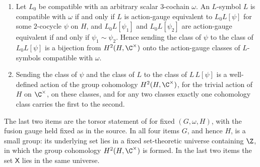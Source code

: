 \begin{lemma}
\begin{enumerate}
              $\beta\mathbin{\triangleright}\omega$ trivial on $H$, the
              same holds for $(\beta,1)\mathbin{\triangleright}L$ and the
              formula built from $\beta\mathbin{\triangleright}\omega$.
        \item Let $L_0$ be compatible with an arbitrary scalar $3$-cochain
              $\omega$. An $L$-symbol $L$ is compatible with $\omega$ if and
              only if $L$ is action-gauge equivalent to $L_0L[\psi]$ for
              some $2$-cocycle $\psi$ on $H$, and $L_0L[\psi_1]$ and
              $L_0L[\psi_2]$ are action-gauge equivalent if and only if
              $\psi_1\sim\psi_2$. Hence sending the class of $\psi$ to the
              class of $L_0L[\psi]$ is a bijection from $H^2(H,\C^\times)$
              onto the action-gauge classes of $L$-symbols compatible with
              $\omega$.
        \item Sending the class of $\psi$ and the class of $L$ to the
              class of $L\,L[\psi]$ is a well-defined action of the group
              cohomology $H^2(H,\C^\times)$, for the trivial action of $H$
              on $\C^\times$, on these classes, and for any two classes
              exactly one cohomology class carries the first to the second.
    \end{enumerate}
    The last two items are the torsor statement of \cite{GarreRubio2023MPOSym}
    for fixed $(G,\omega,H)$, with the fusion gauge held fixed as in the
    source. In all four items $G$, and hence $H$, is a small group: its
    underlying set lies in a fixed set-theoretic universe containing $\Z$,
    in which the group cohomology $H^2(H,\C^\times)$ is formed. In the last
    two items the set $\mathsf X$ lies in the same universe.
\end{lemma}

